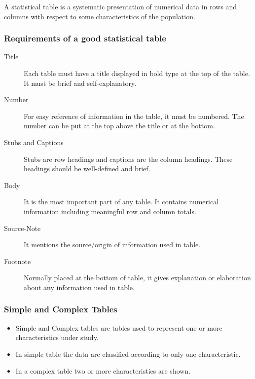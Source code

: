 \documentclass[
10pt, %
a4paper, %
]{report}
\begin{document}
A statistical table is a systematic presentation of numerical data in rows and columns with respect to some characteristics of the population.

\subsubsection*{Requirements of a good statistical table}
\begin{description}
\item[Title] Each table must have a title
displayed in bold type at the top of the table. It must
be brief and self-explanatory.
\item[Number] For easy reference of information in
the table, it must be numbered. The number can be
put at the top above the title or at the bottom.
\item [Stubs and Captions] Stubs are row headings and
captions are the column headings. These headings
should be well-defined and brief.
\item[Body] It is the most important part of any
table. It contains numerical information including
meaningful row and column totals.
\item[Source-Note] It mentions the source/origin of
information used in table.
\item[Footnote] Normally placed at the bottom of table, it gives explanation or elaboration about any information used in table.
\end{description}

\subsubsection*{Simple and Complex Tables}
\begin{itemize}
\item Simple and Complex tables are tables used to represent one or more characteristics under study.
\item In simple table the data are classified according to only one characteristic.
\item In a complex table two or more characteristics are shown.
\end{itemize}
\end{document}

